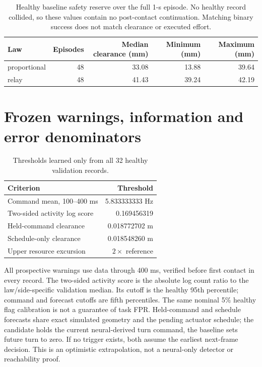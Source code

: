 \documentclass[10pt,letterpaper]{article}
\begin{document}
\begin{table}[H]
\centering\small
\caption{Healthy baseline safety reserve over the full 1-s episode. No healthy record collided, so these values contain no post-contact continuation. Matching binary success does not match clearance or executed effort.}
\begin{tabular}{lrrrr}
\toprule
Law & Episodes & Median clearance (mm) & Minimum (mm) & Maximum (mm)\\
\midrule
proportional & 48 & 33.08 & 13.88 & 39.64\\
relay & 48 & 41.43 & 39.24 & 42.19\\
\bottomrule
\end{tabular}
\end{table}

\section{Frozen warnings, information and error denominators}

\begin{table}[H]
\centering\small
\caption{Thresholds learned only from all 32 healthy validation records.}
\begin{tabular}{lr}
\toprule
Criterion & Threshold\\
\midrule
Command mean, 100--400 ms & 5.833333333 Hz\\
Two-sided activity log score & 0.169456319\\
Held-command clearance & 0.018772702 m\\
Schedule-only clearance & 0.018548260 m\\
Upper resource excursion & $2\times$ reference\\
\bottomrule
\end{tabular}
\end{table}

All prospective warnings use data through 400 ms, verified before first contact in every record. The two-sided activity score is the absolute log count ratio to the law/side-specific validation median. Its cutoff is the healthy 95th percentile; command and forecast cutoffs are fifth percentiles. The same nominal 5\% healthy flag calibration is not a guarantee of task FPR. Held-command and schedule forecasts share exact simulated geometry and the pending actuator schedule; the candidate holds the current neural-derived turn command, the baseline sets future turn to zero. If no trigger exists, both assume the earliest next-frame decision. This is an optimistic extrapolation, not a neural-only detector or reachability proof.
\end{document}
